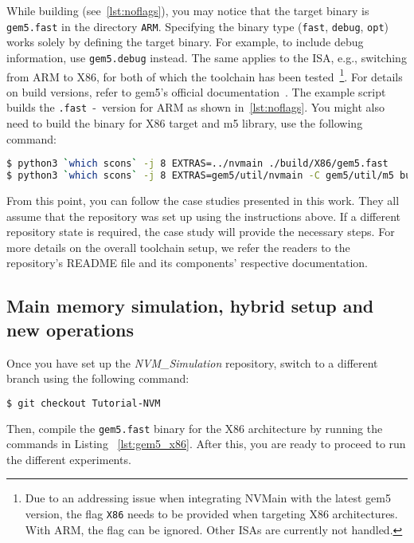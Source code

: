 While building (see~\cref{lst:noflags}), you may notice that the target binary is \texttt{gem5.fast} in the directory \texttt{ARM}. Specifying the binary type (\texttt{fast}, \texttt{debug}, \texttt{opt}) works solely by defining the target binary. For example, to include debug information, use \texttt{gem5.debug} instead. The same applies to the ISA, e.g., switching from ARM to X86, for both of which the toolchain has been tested~\footnote{
Due to an addressing issue when integrating NVMain with the latest gem5 version, the flag \texttt{X86} needs to be provided when targeting X86 architectures. With ARM, the flag can be ignored. Other ISAs are currently not handled.
}. For details on build versions, refer to gem5's official documentation~\cite{gem5:documentation}. The example script builds the \texttt{.fast}~-~version for ARM as shown in~\cref{lst:noflags}.
You might also need to build the binary for X86 target and m5 library, use the following command:
\begin{lstlisting}[caption={Build X86 target and m5 library},label=lst:gem5_x86,language=bash]
$ python3 `which scons` -j 8 EXTRAS=../nvmain ./build/X86/gem5.fast
$ python3 `which scons` -j 8 EXTRAS=gem5/util/nvmain -C gem5/util/m5 build/x86/out/m5
\end{lstlisting}



From this point, you can follow the case studies presented in this work. They all assume that the repository was set up using the instructions above. 
If a different repository state is required, the case study will provide the necessary steps. 
For more details on the overall toolchain setup, we refer the readers to the repository's README file and its components' respective documentation.
 
\subsection*{Main memory simulation, hybrid setup and new operations}
\label{app:tudr:main_memory}
Once you have set up the \textit{NVM\_Simulation} repository, switch to a different branch using the following command:
\begin{lstlisting}[caption={Build gem5 and m5 library},language=bash]
$ git checkout Tutorial-NVM
\end{lstlisting}
Then,  compile the \texttt{gem5.fast} binary for the X86 architecture by running the commands in Listing ~\cref{lst:gem5_x86}. After this, you are ready to proceed to run the different experiments.

